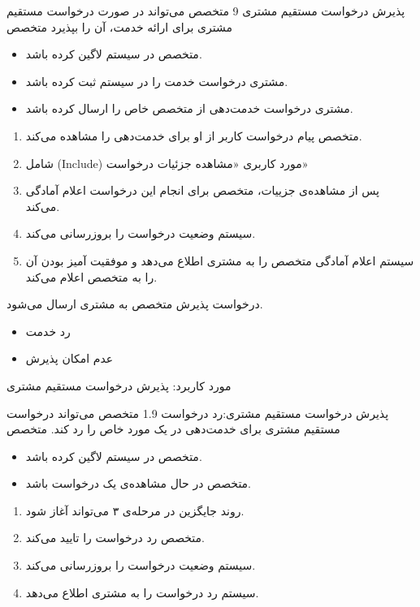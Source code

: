 {
	\usecase
	{پذیرش درخواست مستقیم مشتری}
	{9}
	{متخصص می‌تواند در صورت درخواست مستقیم مشتری برای ارائه خدمت، آن را بپذیرد}
	{متخصص}
	{}
	{	
		\begin{itemize}
			\vspace*{-0.6cm}
			\item 
			متخصص در سیستم لاگین کرده باشد.
			\item
			مشتری درخواست خدمت را در سیستم ثبت کرده باشد.
			\item
			مشتری درخواست خدمت‌دهی از متخصص خاص را ارسال کرده باشد.
		\end{itemize}
	}
	{ 
		\vspace*{-0.6cm}
		\begin{enumerate}
			\item
			متخصص پیام درخواست کاربر از او برای خدمت‌دهی را مشاهده می‌کند.
			\item 
			شامل (Include) مورد کاربری «مشاهده جزئیات درخواست»
			\item
			پس از مشاهده‌ی جزییات، متخصص برای انجام این درخواست اعلام آمادگی می‌کند.
				\item
		سیستم وضعیت درخواست را بروزرسانی می‌کند.
			\item
			سیستم اعلام آمادگی متخصص را به مشتری اطلاع می‌دهد و موفقیت آمیز بودن آن را به متخصص اعلام می‌کند.
		\end{enumerate}
	}
	{درخواست پذیرش متخصص به مشتری ارسال می‌شود.}
	{
		\begin{itemize}
			\vspace*{-0.6cm}
			\item
			رد خدمت
			\item 
			 عدم امکان پذیرش
		\end{itemize}
	}
	{
		مورد کاربرد: پذیرش درخواست مستقیم مشتری
	}
	
	\alternativeflow
	{
		پذیرش درخواست مستقیم مشتری:رد درخواست
	}
	{1.9}
	{
		متخصص می‌تواند درخواست‌ مستقیم مشتری برای خدمت‌دهی در یک مورد خاص را رد کند.
	}
	{
		متخصص
	}
	{}
	{
		\begin{itemize}
			\vspace*{-0.6cm}
			\item 
			متخصص در سیستم لاگین کرده باشد.
			\item
			متخصص در حال مشاهده‌ی یک درخواست باشد.
		\end{itemize}
	}
	{
		\vspace*{-0.6cm}
		\begin{enumerate}
			\item 
			روند جایگزین در مرحله‌ی ۳ می‌تواند آغاز شود.
			\item
			متخصص رد درخواست را تایید می‌کند.
							\item
		سیستم وضعیت درخواست را بروزرسانی می‌کند.
				\item
سیستم رد درخواست را به مشتری اطلاع می‌دهد.
		

\end{enumerate}}}
